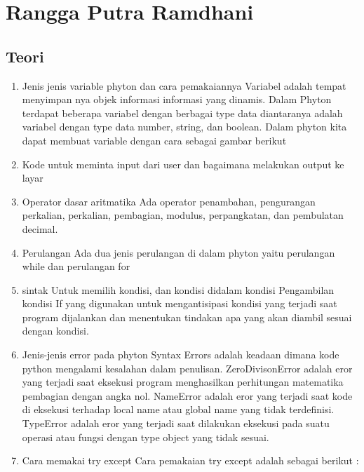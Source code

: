 
\section{Rangga Putra Ramdhani}
\subsection{Teori}
\begin{enumerate}
    \item Jenis jenis variable phyton dan cara pemakaiannya
Variabel adalah tempat menyimpan nya objek informasi informasi yang dinamis. Dalam Phyton terdapat beberapa variabel dengan berbagai type data diantaranya adalah variabel dengan type data number, string, dan boolean. Dalam phyton kita dapat membuat variable dengan cara sebagai gambar berikut
   
    \item Kode untuk meminta input dari user dan bagaimana melakukan output ke layar
 
    \item Operator dasar aritmatika
Ada operator penambahan, pengurangan perkalian, perkalian, pembagian, modulus, perpangkatan, dan pembulatan decimal.

    \item Perulangan
Ada dua jenis perulangan di dalam phyton yaitu perulangan while dan perulangan for
 
 
    \item sintak Untuk memilih kondisi, dan kondisi didalam kondisi
Pengambilan kondisi If yang digunakan untuk mengantisipasi kondisi yang terjadi saat program dijalankan dan menentukan tindakan apa yang akan diambil sesuai dengan kondisi.
  
  
  

    \item Jenis-jenis error pada phyton
Syntax Errors adalah keadaan dimana kode python mengalami kesalahan dalam penulisan. 
ZeroDivisonError adalah eror yang terjadi saat eksekusi program menghasilkan perhitungan matematika pembagian dengan angka nol.
NameError adalah eror yang terjadi saat kode di eksekusi terhadap local name atau global name yang tidak terdefinisi. 
TypeError adalah eror yang terjadi saat dilakukan eksekusi pada suatu operasi atau fungsi dengan type object yang tidak sesuai.

    \item Cara memakai try except
Cara pemakaian try except adalah sebagai berikut :



\end{enumerate}

